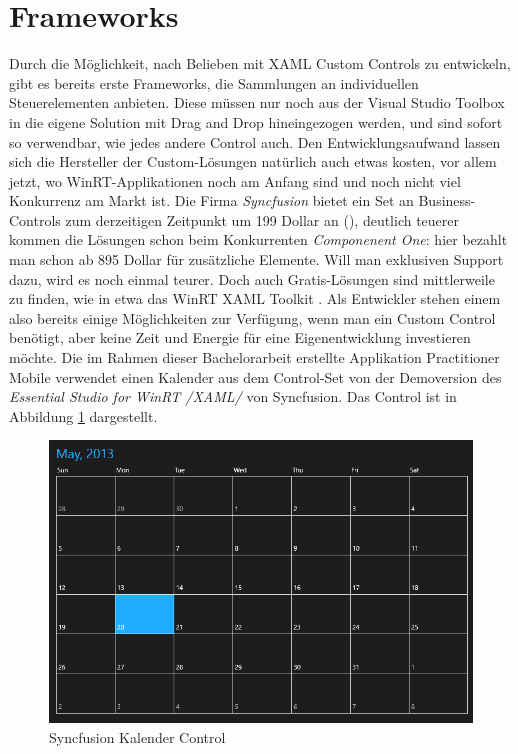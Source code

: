\documentclass[a4paper,bibtotoc,oneside]{scrbook}
\begin{document}
\section[Frameworks]{Frameworks}
Durch die Möglichkeit, nach Belieben mit XAML Custom Controls zu entwickeln, gibt es bereits erste Frameworks, die Sammlungen an individuellen Steuerelementen anbieten. Diese müssen nur noch aus der Visual Studio Toolbox in die eigene Solution mit Drag and Drop hineingezogen werden, und sind sofort so verwendbar, wie jedes andere Control auch.
\newline
\newline
Den Entwicklungsaufwand lassen sich die Hersteller der Custom-Lösungen natürlich auch etwas kosten, vor allem jetzt, wo WinRT-Applikationen noch am Anfang sind und noch nicht viel Konkurrenz am Markt ist.
\newline
Die Firma \textit{Syncfusion} bietet ein Set an Business-Controls zum derzeitigen Zeitpunkt um 199 Dollar an (\cite{syncfn}), deutlich teuerer kommen die Lösungen schon beim Konkurrenten \textit{Componenent One}: hier bezahlt man schon ab 895 Dollar für zusätzliche Elemente. Will man exklusiven Support dazu, wird es noch einmal teurer. \cite{cone}
\newline
\newline
Doch auch Gratis-Lösungen sind mittlerweile zu finden, wie in etwa das WinRT XAML Toolkit \cite{cptk}. Als Entwickler stehen einem also bereits einige Möglichkeiten zur Verfügung, wenn man ein Custom Control benötigt, aber keine Zeit und Energie für eine Eigenentwicklung investieren möchte.
\newline
\newline
Die im Rahmen dieser Bachelorarbeit erstellte Applikation Practitioner Mobile verwendet einen Kalender aus dem Control-Set von der Demoversion des \textit{Essential Studio for WinRT /XAML/} von Syncfusion. Das Control ist in Abbildung \ref{img:calendar} dargestellt.
\begin{figure}[htbp]
\centering
\includegraphics[scale=0.7]{images/calendar.png}
\caption[Syncfusion Kalender Control]{Syncfusion Kalender Control}\label{img:calendar}
\end{figure}
\end{document}

